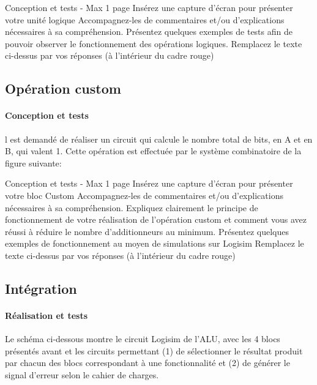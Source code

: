 \documentclass[a4paper]{article}
\begin{document}
\begin{tcolorbox}[colframe=Monokaimagenta,colback=white]
Conception et tests - Max 1 page 
Insérez une capture d’écran pour présenter votre unité logique
Accompagnez-les de commentaires et/ou d’explications nécessaires à sa compréhension.
Présentez quelques exemples de tests  afin de pouvoir observer le fonctionnement des opérations logiques.
Remplacez le texte ci-dessus par vos réponses (à l’intérieur du cadre rouge)
\end{tcolorbox}

\subsection{Opération custom}
\label{custom}

\paragraph{Conception et tests}
l est demandé de réaliser un circuit qui calcule le nombre total de bits, en A et en B, qui valent 1. Cette opération est effectuée par le système combinatoire de la figure suivante:

\begin{tcolorbox}[colframe=Monokaimagenta,colback=white]
Conception et tests -  Max 1 page 
Insérez une capture d’écran pour présenter votre bloc Custom
Accompagnez-les de commentaires et/ou d’explications nécessaires à sa compréhension.
Expliquez clairement le principe de fonctionnement de votre réalisation de l’opération custom et comment vous avez réussi à réduire le nombre d’additionneurs au minimum.
Présentez quelques exemples de fonctionnement au moyen de simulations sur Logisim
Remplacez le texte ci-dessus par vos réponses (à l’intérieur du cadre rouge)
\end{tcolorbox}

\subsection{Intégration}
\paragraph{Réalisation et tests}
Le schéma ci-dessous montre le circuit Logisim de l’ALU, avec les 4 blocs présentés avant et les circuits permettant (1) de sélectionner le résultat produit par chacun des blocs correspondant à une fonctionnalité et (2) de générer le signal d’erreur selon le cahier de charges. 
\end{document}
